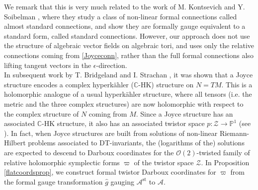 \documentclass{article}
\theoremstyle{definition}
\numberwithin{equation}{section}
\begin{document}
We remark that this is very much related to the work of M. Kontsevich and Y. Soibelman \cite[Section 5.3]{KSresurgence}, where they study a class of non-linear formal connections called almost standard connections, and show they are formally gauge equivalent to a standard form, called standard connections.  However, our approach does not use the structure of algebraic vector fields on algebraic tori, and uses only the relative connections coming from \eqref{Joyceconn}, rather than the full formal connections also lifting tangent vectors in the $\epsilon$-direction.  \\


In subsequent work by T. Bridgeland and I. Strachan \cite{BriStr}, it was shown that a Joyce structure encodes a complex hyperk\"{a}hler ($\mathbb{C}$-HK) structure on $N=TM$. This is a holomorphic analogue of a usual hyperk\"{a}hler structure, where all tensors (i.e. the metric and the three complex structures) are now holomorphic with respect to the complex structure of $N$ coming from $M$. Since a Joyce structure has an associated $\mathbb{C}$-HK structure, it also has an associated twistor space $p:\mathcal{Z}\to \mathbb{P}^1$ (see \cite{TwistorJoyce}). In fact, when Joyce structures are built from solutions of non-linear Riemann-Hilbert problems associated to DT-invariants, the (logarithms of the) solutions are expected to descend to Darboux coordinates for the $\mathcal{O}(2)$-twisted family of relative holomorphic symplectic forms $\varpi$ of the twistor space $\mathcal{Z}$. In Proposition \ref{flatcoordsprop}, we construct formal twistor Darboux coordinates for $\varpi$ from the formal gauge transformation $\hat{g}$ gauging $\mathcal{A}^{\text{st}}$ to $\mathcal{A}$.\\
\end{document}
